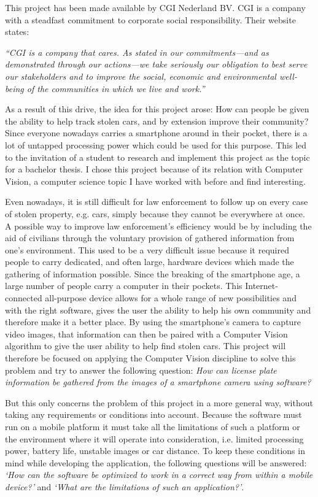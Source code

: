 
This project has been made available by CGI Nederland BV. CGI is a company with a steadfast commitment to corporate social responsibility. Their website states:

\textit{``CGI is a company that cares. As stated in our commitments—and as demonstrated through our actions—we take seriously our obligation to best serve our stakeholders and to improve the social, economic and environmental well-being of the communities in which we live and work.''} \cite{csr-cgi}

As a result of this drive, the idea for this project arose: How can people be given the ability to help track stolen cars, and by extension improve their community? Since everyone nowadays carries a smartphone around in their pocket, there is a lot of untapped processing power which could be used for this purpose. This led to the invitation of a student to research and implement this project as the topic for a bachelor thesis. I chose this project because of its relation with Computer Vision, a computer science topic I have worked with before and find interesting.


Even nowadays, it is still difficult for law enforcement to follow up on every case of stolen property, e.g. cars, simply because they cannot be everywhere at once. A possible way to improve law enforcement's efficiency would be by including the aid of civilians through the voluntary provision of gathered information from one's environment. This used to be a very difficult issue because it required people to carry dedicated, and often large, hardware devices which made the gathering of information possible. Since the breaking of the smartphone age, a large number of people carry a computer in their pockets. This Internet-connected all-purpose device allows for a whole range of new possibilities and with the right software, gives the user the ability to help his own community and therefore make it a better place. By using the smartphone's camera to capture video images, that information can then be paired with a Computer Vision algorithm to give the user ability to help find stolen cars. This project will therefore be focused on applying the Computer Vision discipline to solve this problem and try to answer the following question: \textit{How can license plate information be gathered from the images of a smartphone camera using software?}

But this only concerns the problem of this project in a more general way, without taking any requirements or conditions into account. Because the software must run on a mobile platform it must take all the limitations of such a platform or the environment where it will operate into consideration, i.e. limited processing power, battery life, unstable images or car distance. To keep these conditions in mind while developing the application, the following questions will be answered: \textit{`How can the software be optimized to work in a correct way from within a mobile device?'} and \textit{`What are the limitations of such an application?'}.

